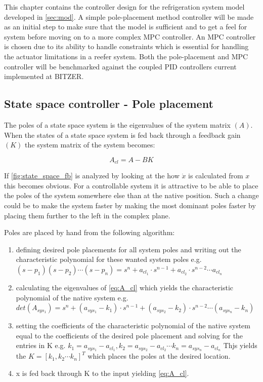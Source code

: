 This chapter contains the controller design for the refrigeration system model developed in \cref{sec:mod}. A simple pole-placement method controller will be made as an initial step to make sure that the model is sufficient and to get a feel for system before moving on to a more complex MPC controller. An MPC controller is chosen due to its ability to handle constraints which is essential for handling the actuator limitations in a reefer system. Both the pole-placement and MPC controller will be benchmarked against the coupled PID controllers current implemented at BITZER.


\subsection{State space controller - Pole placement}
The poles of a state space system is the eigenvalues of the system matrix $(A)$. When the states of a state space system is fed back through a feedback gain $(K)$ the system matrix of the system becomes:

\begin{equation} \label{eq:A_cl}
	A_{cl} = A-BK
\end{equation}

If \cref{fig:state_space_fb} is analyzed by looking at the how $\dot{x}$ is calculated from $x$ this becomes obvious. For a controllable system it is attractive to be able to place the poles of the system somewhere else than at the native position. Such a change could be to make the system faster by making the most dominant poles faster by placing them further to the left in the complex plane.

Poles are placed by hand from the following algorithm:
\begin{enumerate}
	\item defining desired pole placements for all system poles and writing out the characteristic polynomial for these wanted system poles e.g.
	$(s-p_1)(s-p_2) \cdots (s-p_n) = s^n + a_{cl_1} \cdot s^{n-1} + a_{cl_2} \cdot s^{n-2} \cdots a_{cl_n}$
	\item calculating the eigenvalues of \cref{eq:A_cl} which yields the characteristic polynomial of the native system e.g.
	$det(A_{sys_1}) = s^n + (a_{sys_1}-k_1) \cdot s^{n-1} + (a_{sys_2}-k_2) \cdot s^{n-2} \cdots (a_{sys_n}-k_n)$
	\item setting the coefficients of the characteristic polynomial of the native system equal to the coefficients of the desired pole placement and solving for the entries in K e.g.
	$ k_1 = a_{sys_1}-a_{cl_1}, k_2 = a_{sys_2}-a_{cl_2} \cdots k_n = a_{sys_n}-a_{cl_n} $
	 Thjs yields the $ K = [k_1, k_2 \cdots k_n]^T $ which places the poles at the desired location.
	\item x is fed back through K to the input yielding \cref{eq:A_cl}.
\end{enumerate}

